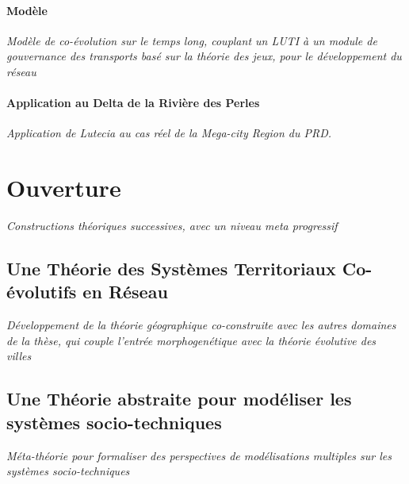 \paragraph{Modèle}

\textit{Modèle de co-évolution sur le temps long, couplant un LUTI à un module de gouvernance des transports basé sur la théorie des jeux, pour le développement du réseau~\cite{le2015modeling}}

\paragraph{Application au Delta de la Rivière des Perles}

\textit{Application de Lutecia au cas réel de la Mega-city Region du PRD.}





\section{Ouverture}




\textit{Constructions théoriques successives, avec un niveau meta progressif}

\subsection{Une Théorie des Systèmes Territoriaux Co-évolutifs en Réseau}

\textit{Développement de la théorie géographique co-construite avec les autres domaines de la thèse, qui couple l'entrée morphogenétique avec la théorie évolutive des villes~\cite{raimbault:halshs-01422484}}


\subsection{Une Théorie abstraite pour modéliser les systèmes socio-techniques}

\textit{Méta-théorie pour formaliser des perspectives de modélisations multiples sur les systèmes socio-techniques} 



